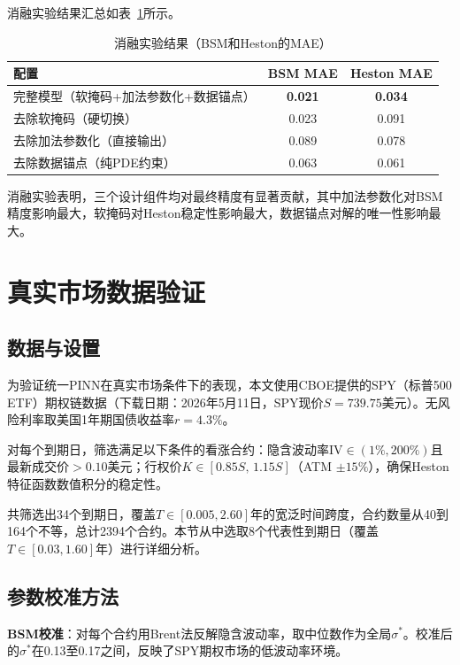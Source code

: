 消融实验结果汇总如表~\ref{tab:ablation}所示。

\begin{table}[htbp]
  \centering
  \caption{消融实验结果（BSM和Heston的MAE）}
  \label{tab:ablation}
  \begin{tabular}{lcc}
    \hline
    配置 & BSM MAE & Heston MAE \\
    \hline
    完整模型（软掩码+加法参数化+数据锚点） & \textbf{0.021} & \textbf{0.034} \\
    去除软掩码（硬切换） & 0.023 & 0.091 \\
    去除加法参数化（直接输出） & 0.089 & 0.078 \\
    去除数据锚点（纯PDE约束） & 0.063 & 0.061 \\
    \hline
  \end{tabular}
\end{table}

消融实验表明，三个设计组件均对最终精度有显著贡献，其中加法参数化对BSM精度影响最大，软掩码对Heston稳定性影响最大，数据锚点对解的唯一性影响最大。

\section{真实市场数据验证}\label{sec:market_validation}

\subsection{数据与设置}

为验证统一PINN在真实市场条件下的表现，本文使用CBOE提供的SPY（标普500 ETF）期权链数据（下载日期：2026年5月11日，SPY现价$S=739.75$美元）。无风险利率取美国1年期国债收益率$r=4.3\%$。

对每个到期日，筛选满足以下条件的看涨合约：隐含波动率$\text{IV}\in(1\%, 200\%)$且最新成交价$>0.10$美元；行权价$K\in[0.85S,\,1.15S]$（ATM $\pm15\%$），确保Heston特征函数数值积分的稳定性。

共筛选出34个到期日，覆盖$T\in[0.005, 2.60]$年的宽泛时间跨度，合约数量从40到164个不等，总计2394个合约。本节从中选取8个代表性到期日（覆盖$T\in[0.03, 1.60]$年）进行详细分析。

\subsection{参数校准方法}

\textbf{BSM校准}：对每个合约用Brent法反解隐含波动率，取中位数作为全局$\sigma^*$。校准后的$\sigma^*$在0.13至0.17之间，反映了SPY期权市场的低波动率环境。

